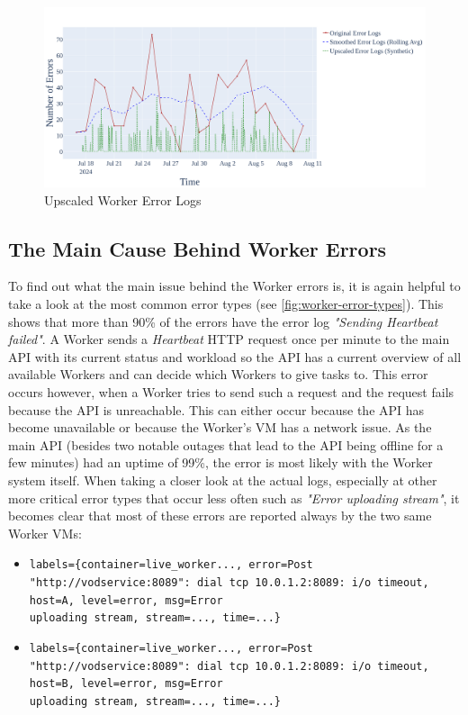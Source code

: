 \begin{figure}[htpb]
    \centering
    \includegraphics[width=\linewidth]{images/plots/worker/upscaled_error_logs.png}
    \caption[Upscaled Worker Error Logs]{Upscaled Worker Error Logs}\label{fig:worker-upscaled-error-logs}
\end{figure}

\subsection{The Main Cause Behind Worker Errors}

To find out what the main issue behind the Worker errors is, it is again helpful to take a look at the most common error types (see \autoref{fig:worker-error-types}). This shows that more than 90\% of the errors have the error log \textit{"Sending Heartbeat failed"}. A Worker sends a \textit{Heartbeat} HTTP request once per minute to the main \ac{API} with its current status and workload so the \ac{API} has a current overview of all available Workers and can decide which Workers to give tasks to. This error occurs however, when a Worker tries to send such a request and the request fails because the \ac{API} is unreachable. This can either occur because the \ac{API} has become unavailable or because the Worker's \ac{VM} has a network issue. As the main \ac{API} (besides two notable outages that lead to the \ac{API} being offline for a few minutes) had an uptime of 99\%, the error is most likely with the Worker system itself. 
When taking a closer look at the actual logs, especially at other more critical error types that occur less often such as \textit{"Error uploading stream"}, it becomes clear that most of these errors are reported always by the two same Worker \ac{VM}s:

\begin{itemize}
    \item \texttt{labels=\{container=live\_worker..., error=Post "http://vodservice:8089": dial tcp 10.0.1.2:8089: i/o timeout, host=A, level=error, msg=Error\\ uploading stream, stream=..., time=...\}}

    \item \texttt{labels=\{container=live\_worker..., error=Post "http://vodservice:8089": dial tcp 10.0.1.2:8089: i/o timeout, host=B, level=error, msg=Error\\ uploading stream, stream=..., time=...\}}
\end{itemize}

